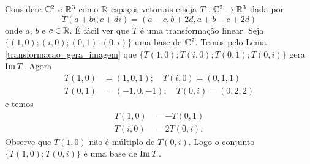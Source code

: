 \begin{exemplo}
	Considere $\mathbb{C}^2$ e $\mathbb{R}^3$ como $\mathbb{R}$-espaços vetoriais e seja $T : \mathbb{C}^2 \to \mathbb{R}^3$ dada por
	\[
		T(a+bi, c+di) = (a - c, b + 2d, a + b - c + 2d)
	\]
	onde $a$, $b$ e $c \in \mathbb{R}$. É fácil ver que $T$ é uma transformação linear. Seja $\{(1,0);(i,0);(0,1);(0,i)\}$ uma base de $\mathbb{C}^2$. Temos pelo Lema \ref{transformacao_gera_imagem} que $\{T(1,0);T(i,0);T(0,1);T(0,i)\}$ gera ${\rm Im\,} T$. Agora
	\begin{align*}
		T(1,0) &= (1,0,1);\quad T(i,0) = (0,1,1)\\
		T(0,1) &= (-1,0,-1);\quad T(0,i) = (0,2,2)
	\end{align*}
	e temos
	\begin{align*}
		T(1,0) &= -T(0,1)\\
		T(i,0) &= 2T(0,i).
	\end{align*}
	Observe que $T(1,0)$ não é múltiplo de $T(0,i)$. Logo o conjunto $\{T(1,0); T(0,i)\}$ é uma base de ${\rm Im\,} T$.
\end{exemplo}